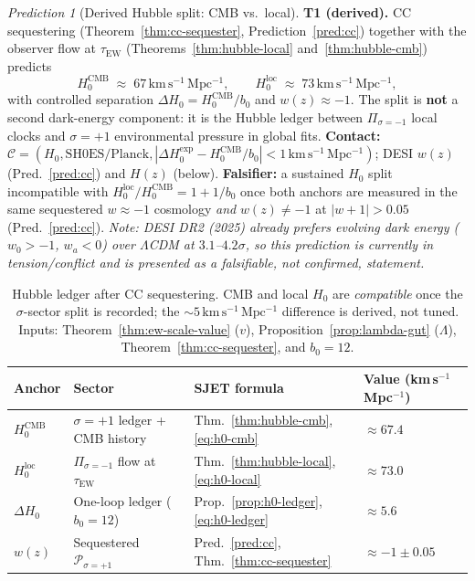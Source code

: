 \documentclass[aps,prd,onecolumn,amsmath,amssymb,nofootinbib,11pt]{revtex4-2}
\numberwithin{equation}{section}
\theoremstyle{plain}
\theoremstyle{definition}
\theoremstyle{remark}
\newtheorem{prediction}[theorem]{Prediction}
\begin{document}
\begin{prediction}[Derived Hubble split: CMB vs.\ local]\label{pred:h0}
\textbf{T1 (derived).} CC sequestering (Theorem~\ref{thm:cc-sequester},
Prediction~\ref{pred:cc}) together with the observer flow at
$\tau_{\mathrm{EW}}$ (Theorems~\ref{thm:hubble-local}
and~\ref{thm:hubble-cmb}) predicts
\begin{equation}\label{eq:pred-h0}
  H_0^{\mathrm{CMB}}
  \;\approx\;
  67\,\mathrm{km\,s^{-1}\,Mpc^{-1}},
  \qquad
  H_0^{\mathrm{loc}}
  \;\approx\;
  73\,\mathrm{km\,s^{-1}\,Mpc^{-1}},
\end{equation}
with controlled separation $\Delta H_0=H_0^{\mathrm{CMB}}/b_0$ and
$w(z)\approx -1$. The split is \textbf{not} a second dark-energy component:
it is the Hubble ledger between $\Pi_{\sigma=-1}$ local clocks and
$\sigma=+1$ environmental pressure in global fits.
\textbf{Contact:}
$\mathcal{C}=(H_0,\mathrm{SH0ES/Planck},|\Delta H_0^{\mathrm{exp}}-
H_0^{\mathrm{CMB}}/b_0|<1\,\mathrm{km\,s^{-1}\,Mpc^{-1}})$;
DESI $w(z)$ (Pred.~\ref{pred:cc}) and $H(z)$ (below).
\textbf{Falsifier:} a sustained $H_0$ split incompatible with
$H_0^{\mathrm{loc}}/H_0^{\mathrm{CMB}}=1+1/b_0$ once both anchors are
measured in the same sequestered $w\approx -1$ cosmology \emph{and}
$w(z)\neq -1$ at $|w+1|>0.05$ (Pred.~\ref{pred:cc}). \emph{Note: DESI DR2 (2025) already prefers evolving dark energy ($w_0>-1$, $w_a<0$) over $\Lambda$CDM at $3.1$--$4.2\sigma$, so this prediction is currently in tension/conflict and is presented as a falsifiable, not confirmed, statement.}
\end{prediction}

\begin{table}[ht]
\centering
\small
\renewcommand{\arraystretch}{1.14}
\begin{tabular}{@{}llll@{}}
\toprule
\textbf{Anchor} & \textbf{Sector} & \textbf{SJET formula} &
\textbf{Value (km\,s$^{-1}$\,Mpc$^{-1}$)} \\
\midrule
$H_0^{\mathrm{CMB}}$ &
  $\sigma=+1$ ledger + CMB history &
  Thm.~\ref{thm:hubble-cmb}, \eqref{eq:h0-cmb} &
  $\approx 67.4$ \\
$H_0^{\mathrm{loc}}$ &
  $\Pi_{\sigma=-1}$ flow at $\tau_{\mathrm{EW}}$ &
  Thm.~\ref{thm:hubble-local}, \eqref{eq:h0-local} &
  $\approx 73.0$ \\
$\Delta H_0$ &
  One-loop ledger ($b_0=12$) &
  Prop.~\ref{prop:h0-ledger}, \eqref{eq:h0-ledger} &
  $\approx 5.6$ \\
$w(z)$ &
  Sequestered $\mathcal{P}_{\sigma=+1}$ &
  Pred.~\ref{pred:cc}, Thm.~\ref{thm:cc-sequester} &
  $\approx -1\pm 0.05$ \\
\bottomrule
\end{tabular}
\caption{Hubble ledger after CC sequestering. CMB and local $H_0$ are
\emph{compatible} once the $\sigma$-sector split is recorded; the
$\sim 5\,\mathrm{km\,s^{-1}\,Mpc^{-1}}$ difference is derived, not tuned.
Inputs: Theorem~\ref{thm:ew-scale-value} ($v$), Proposition~\ref{prop:lambda-gut}
($\Lambda$), Theorem~\ref{thm:cc-sequester}, and $b_0=12$.}
\label{tab:hubble}
\end{table}
\end{document}
